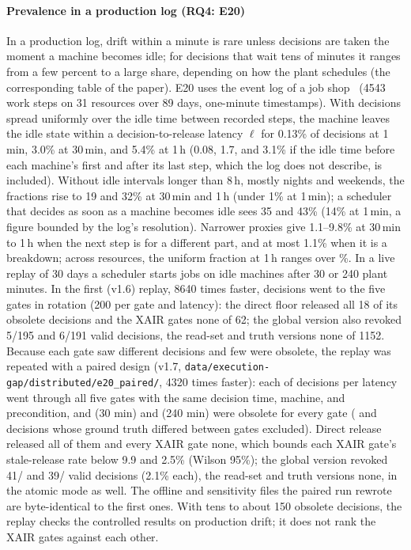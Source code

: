 \documentclass[11pt]{article}
\begin{document}
\paragraph{Prevalence in a production log (RQ4: E20)}
In a production log, drift within a minute is rare unless decisions are taken the moment a machine becomes idle; for decisions that wait tens of minutes it ranges from a few percent to a large share, depending on how the plant schedules (the corresponding table of the paper). E20 uses the event log of a job shop~ (4543 work steps on 31 resources over 89 days, one-minute timestamps). With decisions spread uniformly over the idle time between recorded steps, the machine leaves the idle state within a decision-to-release latency $\ell$ for 0.13\% of decisions at 1\,min, 3.0\% at 30\,min, and 5.4\% at 1\,h (0.08, 1.7, and 3.1\% if the idle time before each machine's first and after its last step, which the log does not describe, is included). Without idle intervals longer than 8\,h, mostly nights and weekends, the fractions rise to 19 and 32\% at 30\,min and 1\,h (under 1\% at 1\,min); a scheduler that decides as soon as a machine becomes idle sees 35 and 43\% (14\% at 1\,min, a figure bounded by the log's resolution). Narrower proxies give 1.1--9.8\% at 30\,min to 1\,h when the next step is for a different part, and at most 1.1\% when it is a breakdown; across resources, the uniform fraction at 1\,h ranges over \TwentyPerResource\%. In a live replay of 30 days a scheduler starts jobs on idle machines after 30 or 240 plant minutes. In the first (v1.6) replay, 8640 times faster, decisions went to the five gates in rotation (200 per gate and latency): the direct floor released all 18 of its obsolete decisions and the XAIR gates none of 62; the global version also revoked 5/195 and 6/191 valid decisions, the read-set and truth versions none of 1152. Because each gate saw different decisions and few were obsolete, the replay was repeated with a paired design (v1.7, \texttt{data/execution-gap/distributed/e20\_paired/}, 4320 times faster): each of \TwentyPDecThirty{} decisions per latency went through all five gates with the same decision time, machine, and precondition, and \TwentyPObsThirty{} (30 min) and \TwentyPObsTwoForty{} (240 min) were obsolete for every gate (\TwentyPDiscThirty{} and \TwentyPDiscTwoForty{} decisions whose ground truth differed between gates excluded). Direct release released all of them and every XAIR gate none, which bounds each XAIR gate's stale-release rate below 9.9 and 2.5\% (Wilson 95\%); the global version revoked 41/\TwentyPValThirty{} and 39/\TwentyPValTwoForty{} valid decisions (2.1\% each), the read-set and truth versions none, in the atomic mode as well. The offline and sensitivity files the paired run rewrote are byte-identical to the first ones. With tens to about 150 obsolete decisions, the replay checks the controlled results on production drift; it does not rank the XAIR gates against each other.
\end{document}
